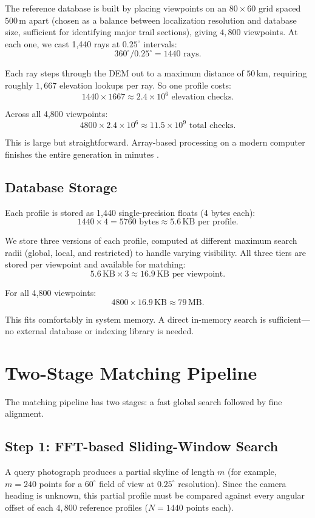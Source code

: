 The reference database is built by placing viewpoints on an $80 \times 60$ grid spaced $500\,\text{m}$ apart (chosen as a balance between localization resolution and database size, sufficient for identifying major trail sections), giving $4{,}800$ viewpoints. At each one, we cast 1,440 rays at $0.25^{\circ}$ intervals:
\[
360^{\circ} / 0.25^{\circ} = 1440 \text{ rays.}
\]

Each ray steps through the DEM out to a maximum distance of $50\,\text{km}$, requiring roughly $1{,}667$ elevation lookups per ray. So one profile costs:
\[
1440 \times 1667 \approx 2.4 \times 10^6 \text{ elevation checks.}
\]

Across all 4,800 viewpoints:
\[
4800 \times 2.4 \times 10^6 \approx 11.5 \times 10^9 \text{ total checks.}
\]

This is large but straightforward. Array-based processing on a modern computer finishes the entire generation in minutes \cite{Steger2022}.

\subsection{Database Storage}
\label{sec:dem-storage}
Each profile is stored as 1,440 single-precision floats (4 bytes each):
\[
1440 \times 4 = 5760 \text{ bytes} \approx 5.6\,\text{KB per profile.}
\]

We store three versions of each profile, computed at different maximum search radii (global, local, and restricted) to handle varying visibility. All three tiers are stored per viewpoint and available for matching:
\[
5.6\,\text{KB} \times 3 \approx 16.9\,\text{KB per viewpoint.}
\]

For all 4,800 viewpoints:
\[
4800 \times 16.9\,\text{KB} \approx 79\,\text{MB.}
\]

This fits comfortably in system memory. A direct in-memory search is sufficient---no external database or indexing library is needed.

\section{Two-Stage Matching Pipeline}
The matching pipeline has two stages: a fast global search followed by fine alignment.

\subsection{Step 1: FFT-based Sliding-Window Search}
A query photograph produces a partial skyline of length $m$ (for example, $m = 240$ points for a $60^{\circ}$ field of view at $0.25^{\circ}$ resolution). Since the camera heading is unknown, this partial profile must be compared against every angular offset of each $4{,}800$ reference profiles ($N = 1440$ points each).

